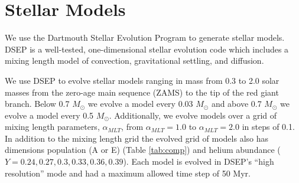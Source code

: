 \section{Stellar Models}\label{sec:modeling}
We use the Dartmouth Stellar Evolution Program \citep[DSEP, ][]{Dotter2008} to
generate stellar models. DSEP is a well-tested, one-dimensional stellar
evolution code which includes a mixing length model of convection,
gravitational settling, and diffusion.

We use DSEP to evolve stellar models ranging in mass from 0.3 to 2.0 solar
masses from the zero-age main sequence (ZAMS) to the tip of the red giant
branch. Below 0.7 $M_{\odot}$ we evolve a model every 0.03 $M_{\odot}$ and
above 0.7 $M_{\odot}$ we evolve a model every 0.5 $M_{\odot}$. Additionally, we
evolve models over a grid of mixing length parameters, $\alpha_{MLT}$, from
$\alpha_{MLT} = 1.0$ to $\alpha_{MLT} = 2.0$ in steps of 0.1. In addition to the
mixing length grid the evolved grid of models also has dimensions population (A
or E) (Table \ref{tab:comp}) and helium abundance ($Y=0.24, 0.27, 0.3, 0.33, 0.36, 0.39$). Each model is evolved in DSEP's ``high
resolution'' mode and had a maximum allowed time step of 50 Myr. 

